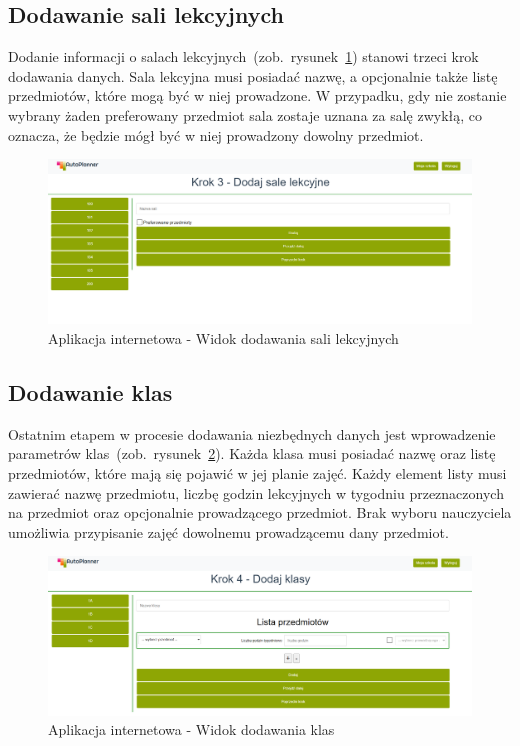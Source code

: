 \subsection{Dodawanie sali lekcyjnych}
Dodanie informacji o salach lekcyjnych~(zob.~rysunek~\ref{rys:classroom}) stanowi trzeci krok dodawania danych. Sala lekcyjna musi posiadać nazwę, a opcjonalnie także listę przedmiotów, które mogą być w  niej prowadzone. W przypadku, gdy nie zostanie wybrany żaden preferowany przedmiot sala zostaje uznana za salę zwykłą, co oznacza, że będzie mógł być w niej prowadzony dowolny przedmiot.
\begin{figure}[!ht]
\centering\includegraphics[width=\textwidth]{figures/classroom}
\caption{Aplikacja internetowa - Widok dodawania sali lekcyjnych}\label{rys:classroom}
\end{figure}
\subsection{Dodawanie klas}
Ostatnim etapem w procesie dodawania niezbędnych danych jest wprowadzenie parametrów klas~(zob.~rysunek~\ref{rys:class}). Każda klasa musi posiadać nazwę oraz listę przedmiotów, które mają się pojawić w jej planie zajęć. Każdy element listy musi zawierać nazwę przedmiotu, liczbę godzin lekcyjnych w tygodniu przeznaczonych na przedmiot oraz opcjonalnie prowadzącego przedmiot. Brak wyboru nauczyciela umożliwia przypisanie zajęć dowolnemu prowadzącemu dany przedmiot.
\begin{figure}[!ht]
\centering\includegraphics[width=\textwidth]{figures/class}
\caption{Aplikacja internetowa - Widok dodawania klas}\label{rys:class}
\end{figure}
